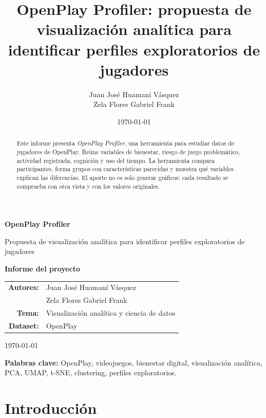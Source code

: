 \documentclass[12pt,a4paper]{article}
\title{\textbf{OpenPlay Profiler: propuesta de visualizaci\'on anal\'itica para identificar perfiles exploratorios de jugadores}}
\author{
Juan Jos\'e Huaman\'i V\'asquez\\
Zela Flores Gabriel Frank
}
\date{\today}
\begin{document}
\begin{titlepage}
    \centering
    \vspace*{1.5cm}

    {\Large \textbf{OpenPlay Profiler}\par}
    \vspace{0.5cm}
    {\large Propuesta de visualizaci\'on anal\'itica para identificar perfiles exploratorios de jugadores\par}

    \vspace{2cm}

    {\large \textbf{Informe del proyecto}\par}

    \vspace{2.5cm}

    \begin{tabular}{rl}
        \textbf{Autores:} & Juan Jos\'e Huaman\'i V\'asquez \\
                          & Zela Flores Gabriel Frank \\
        \textbf{Tema:} & Visualizaci\'on anal\'itica y ciencia de datos \\
        \textbf{Dataset:} & OpenPlay \\
    \end{tabular}

    \vfill

    {\large \today\par}
\end{titlepage}

\tableofcontents
\newpage

\begin{abstract}
Este informe presenta \textit{OpenPlay Profiler}, una herramienta para estudiar datos de jugadores de OpenPlay. Re\'une variables de bienestar, riesgo de juego problem\'atico, actividad registrada, cognici\'on y uso del tiempo. La herramienta compara participantes, forma grupos con caracter\'isticas parecidas y muestra qu\'e variables explican las diferencias. El aporte no es solo generar gr\'aficos: cada resultado se comprueba con otra vista y con los valores originales.
\end{abstract}

\noindent\textbf{Palabras clave:} OpenPlay, videojuegos, bienestar digital, visualizaci\'on anal\'itica, PCA, UMAP, t-SNE, clustering, perfiles exploratorios.

\section{Introducci\'on}
\end{document}
